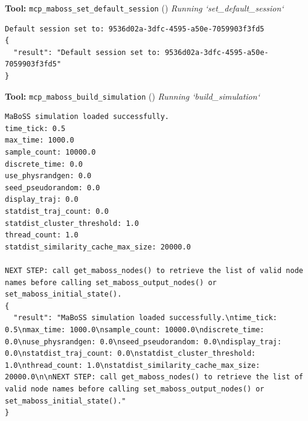 \documentclass[11pt,a4paper]{article}
\begin{document}
\begin{toolokbox}
\textbf{Tool:} \texttt{mcp\_maboss\_set\_default\_session} (\checkmark)
\textit{Running `set\_default\_session`}
\begin{lstlisting}
Default session set to: 9536d02a-3dfc-4595-a50e-7059903f3fd5
{
  "result": "Default session set to: 9536d02a-3dfc-4595-a50e-7059903f3fd5"
}
\end{lstlisting}
\end{toolokbox}
\begin{toolokbox}
\textbf{Tool:} \texttt{mcp\_maboss\_build\_simulation} (\checkmark)
\textit{Running `build\_simulation`}
\begin{lstlisting}
MaBoSS simulation loaded successfully.
time_tick: 0.5
max_time: 1000.0
sample_count: 10000.0
discrete_time: 0.0
use_physrandgen: 0.0
seed_pseudorandom: 0.0
display_traj: 0.0
statdist_traj_count: 0.0
statdist_cluster_threshold: 1.0
thread_count: 1.0
statdist_similarity_cache_max_size: 20000.0

NEXT STEP: call get_maboss_nodes() to retrieve the list of valid node names before calling set_maboss_output_nodes() or set_maboss_initial_state().
{
  "result": "MaBoSS simulation loaded successfully.\ntime_tick: 0.5\nmax_time: 1000.0\nsample_count: 10000.0\ndiscrete_time: 0.0\nuse_physrandgen: 0.0\nseed_pseudorandom: 0.0\ndisplay_traj: 0.0\nstatdist_traj_count: 0.0\nstatdist_cluster_threshold: 1.0\nthread_count: 1.0\nstatdist_similarity_cache_max_size: 20000.0\n\nNEXT STEP: call get_maboss_nodes() to retrieve the list of valid node names before calling set_maboss_output_nodes() or set_maboss_initial_state()."
}
\end{lstlisting}
\end{toolokbox}
\end{document}

